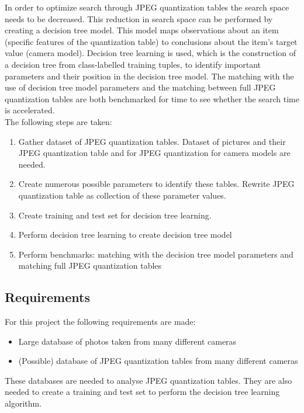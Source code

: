 \documentclass[a4paper,8pt]{article}
\begin{document}
In order to optimize search through JPEG quantization tables the search space needs to be decreased. This reduction in search space can be performed by creating a decision tree model. This model maps observations about an item (specific features of the quantization table) to conclusions about the item's target value (camera model). Decision tree learning is used, which is the construction of a decision tree from class-labelled training tuples, to identify important parameters and their position in the decision tree model. The matching with the use of decision tree model parameters and the matching between full JPEG quantization tables are both benchmarked for time to see whether the search time is accelerated.
~\\
The following steps are taken:
\begin{enumerate}
\item Gather dataset of JPEG quantization tables. Dataset of pictures and their JPEG quantization table and for JPEG quantization for camera models are needed.
\item Create numerous possible parameters to identify these tables. Rewrite JPEG quantization table as collection of these parameter values.
\item Create training and test set for decision tree learning.
\item Perform decision tree learning to create decision tree model
\item Perform benchmarks: matching with the decision tree model parameters and matching full JPEG quantization tables
\end{enumerate}


\subsection*{Requirements}

For this project the following requirements are made:

\begin{itemize}
\item Large database of photos taken from many different cameras
\item (Possible) database of JPEG quantization tables from many different cameras
\end{itemize}

These databases are needed to analyse JPEG quantization tables. They are also needed to create a training and test set to perform the decision tree learning algorithm.
\end{document}
